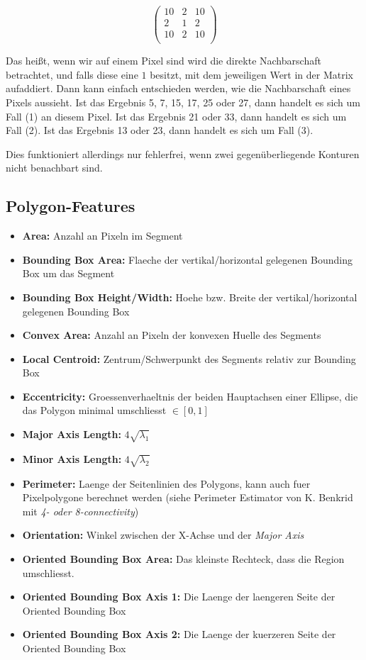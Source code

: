 \begin{equation}
  \begin{pmatrix}
    10 & 2 & 10\\
    2 & 1 & 2\\
    10 & 2 & 10\\
  \end{pmatrix}
\end{equation}

Das heißt, wenn wir auf einem Pixel sind wird die direkte Nachbarschaft betrachtet, und falls diese eine $1$ besitzt, mit dem jeweiligen Wert in der Matrix aufaddiert.
Dann kann einfach entschieden werden, wie die Nachbarschaft eines Pixels aussieht.
Ist das Ergebnis 5, 7, 15, 17, 25 oder 27, dann handelt es sich um Fall (1) an diesem Pixel.
Ist das Ergebnis 21 oder 33, dann handelt es sich um Fall (2).
Ist das Ergebnis 13 oder 23, dann handelt es sich um Fall (3).

Dies funktioniert allerdings nur fehlerfrei, wenn zwei gegenüberliegende Konturen nicht benachbart sind.

\subsection{Polygon-Features}

\begin{itemize}
  \item \textbf{Area:} Anzahl an Pixeln im Segment
  \item \textbf{Bounding Box Area:} Flaeche der vertikal/horizontal gelegenen Bounding Box um das Segment
  \item \textbf{Bounding Box Height/Width:} Hoehe bzw. Breite der vertikal/horizontal gelegenen Bounding Box
  \item \textbf{Convex Area:} Anzahl an Pixeln der konvexen Huelle des Segments
  \item \textbf{Local Centroid:} Zentrum/Schwerpunkt des Segments relativ zur Bounding Box
  \item \textbf{Eccentricity:} Groessenverhaeltnis der beiden Hauptachsen einer Ellipse, die das Polygon minimal umschliesst $\in [0, 1]$
  \item \textbf{Major Axis Length:} $4 \sqrt{\lambda_1}$
  \item \textbf{Minor Axis Length:} $4 \sqrt{\lambda_2}$
  \item \textbf{Perimeter:} Laenge der Seitenlinien des Polygons, kann auch fuer Pixelpolygone berechnet werden (siehe Perimeter Estimator von K. Benkrid mit \emph{4- oder 8-connectivity})
  \item \textbf{Orientation:} Winkel zwischen der X-Achse und der \emph{Major Axis}
  \item \textbf{Oriented Bounding Box Area:} Das kleinste Rechteck, dass die Region umschliesst.
  \item \textbf{Oriented Bounding Box Axis 1:} Die Laenge der laengeren Seite der Oriented Bounding Box
  \item \textbf{Oriented Bounding Box Axis 2:} Die Laenge der kuerzeren Seite der Oriented Bounding Box
\end{itemize}

